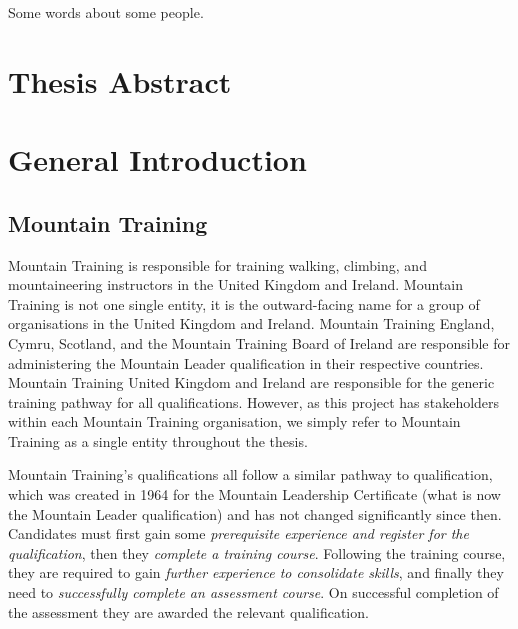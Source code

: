 \documentclass[
  12pt,
  a4paper,
]{book}
\begin{document}
Some words about some people.

{
\setcounter{tocdepth}{2}
\tableofcontents
}
\listoftables
{}

\listoffigures
{}

\mainmatter
\setcounter{page}{1}

\hypertarget{thesis-abstract}{%
\chapter*{Thesis Abstract}\label{thesis-abstract}}

\hypertarget{gen-intro}{%
\chapter{General Introduction}\label{gen-intro}}

\hypertarget{mountain-training}{%
\section{Mountain Training}\label{mountain-training}}

Mountain Training is responsible for training walking, climbing, and mountaineering instructors in the United Kingdom and Ireland. Mountain Training is not one single entity, it is the outward-facing name for a group of organisations in the United Kingdom and Ireland. Mountain Training England, Cymru, Scotland, and the Mountain Training Board of Ireland are responsible for administering the Mountain Leader qualification in their respective countries. Mountain Training United Kingdom and Ireland are responsible for the generic training pathway for all qualifications. However, as this project has stakeholders within each Mountain Training organisation, we simply refer to Mountain Training as a single entity throughout the thesis.

Mountain Training's qualifications all follow a similar pathway to qualification, which was created in 1964 for the Mountain Leadership Certificate (what is now the Mountain Leader qualification) and has not changed significantly since then. Candidates must first gain some \emph{prerequisite experience and register for the qualification}, then they \emph{complete a training course}. Following the training course, they are required to gain \emph{further experience to consolidate skills}, and finally they need to \emph{successfully complete an assessment course}. On successful completion of the assessment they are awarded the relevant qualification.
\end{document}

